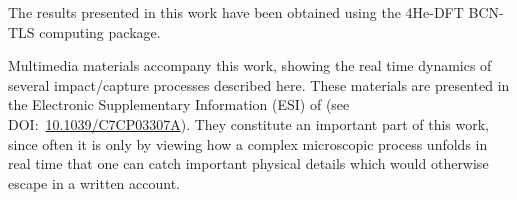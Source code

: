 The results presented in this work have been obtained using the 4He-DFT BCN-TLS computing package\citep{Pi2017}.

Multimedia materials accompany this work, 
showing the real time dynamics of several impact/capture processes 
described here. These materials  are presented 
in the Electronic Supplementary Information (ESI) of (see DOI:~\href{http://dx.doi.org/10.1039/C7CP03307A}{10.1039/C7CP03307A}).
They constitute  an important part of this work, 
since often it is only by viewing how a complex microscopic process
unfolds in real time that one can catch important physical details 
which would otherwise escape in a written account.

%
% 
%
%
%
